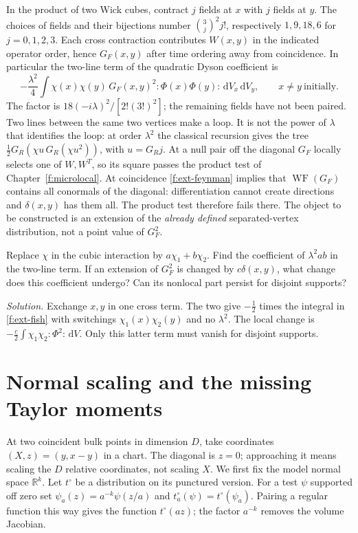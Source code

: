 In the product of two Wick cubes, contract $j$ fields at $x$ with $j$
fields at $y$. The choices of fields and their bijections number
$\binom3j^2j!$, respectively $1,9,18,6$ for $j=0,1,2,3$. Each cross
contraction contributes $W(x,y)$ in the indicated operator order, hence
$G_F(x,y)$ after time ordering away from coincidence. In particular the
two-line term of the quadratic Dyson coefficient is
\begin{equation}
 -\frac{\lambda^2}{4}\int \chi(x)\chi(y)\,G_F(x,y)^2
       :\!\Phi(x)\Phi(y)\!:\,\mathrm{d}V_x\,\mathrm{d}V_y ,
 \qquad x\ne y\ \text{initially} .
 \label{f:ext-fish}
\end{equation}
The factor is $18(-i\lambda)^2/[2!(3!)^2]$; the remaining fields have
not been paired. Two lines between the same two vertices make a loop.
It is not the power of $\lambda$ that identifies the loop: at order
$\lambda^2$ the classical recursion gives the tree
$\tfrac12 G_R(\chi u\,G_R(\chi u^2))$, with $u=G_Rj$.
At a null pair off the diagonal $G_F$ locally selects one of $W,W^T$, so its square
passes the product test of Chapter~\ref{f:microlocal}. At coincidence
\eqref{f:ext-feynman} implies that $\operatorname{WF}(G_F)$ contains all
conormals of the diagonal: differentiation cannot create directions and
$\delta(x,y)$ has them all. The product test therefore fails there. The
object to be constructed is an extension of the \emph{already defined}
separated-vertex distribution, not a point value of $G_F^2$.

\begin{exercise}
Replace $\chi$ in the cubic interaction by $a\chi_1+b\chi_2$. Find the
coefficient of $\lambda^2 ab$ in the two-line term. If an extension of
$G_F^2$ is changed by $c\delta(x,y)$, what change does this coefficient
undergo? Can its nonlocal part persist for disjoint supports?
\end{exercise}
\noindent\emph{Solution.} Exchange $x,y$ in one cross term. The two give
$-\tfrac12$ times the integral in \eqref{f:ext-fish} with switchings
$\chi_1(x)\chi_2(y)$ and no $\lambda^2$. The local change is
$-\tfrac c2\int\chi_1\chi_2:\!\Phi^2\!:\,\mathrm{d}V$. Only this latter
term must vanish for disjoint supports.

\section{Normal scaling and the missing Taylor moments}
At two coincident bulk points in dimension $D$, take coordinates
$(X,z)=(y,x-y)$ in a chart. The diagonal is $z=0$; approaching it means
scaling the $D$ relative coordinates, not scaling $X$. We first fix the
model normal space $\mathbb R^k$. Let $t^\circ$ be a distribution on its
punctured version. For a test $\psi$ supported off zero set
$\psi_a(z)=a^{-k}\psi(z/a)$ and $t^\circ_a(\psi)=t^\circ(\psi_a)$.
Pairing a regular function this way gives the function $t^\circ(az)$;
the factor $a^{-k}$ removes the volume Jacobian.


